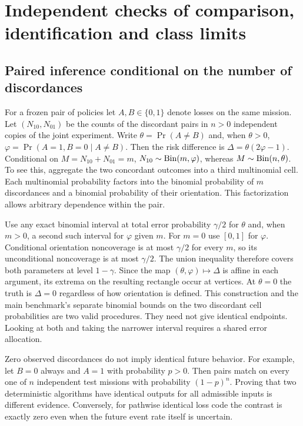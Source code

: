 \section{Independent checks of comparison, identification and class limits}
\subsection{Paired inference conditional on the number of discordances}
For a frozen pair of policies let $A,B\in\{0,1\}$ denote losses on the same mission. Let $(N_{10},N_{01})$ be the counts of the discordant pairs in $n>0$ independent copies of the joint experiment. Write $\theta=\Pr(A\ne B)$ and, when $\theta>0$, $\varphi=\Pr(A=1,B=0\mid A\ne B)$. Then the risk difference is $\Delta=\theta(2\varphi-1)$. Conditional on $M=N_{10}+N_{01}=m$, $N_{10}\sim{\rm Bin}(m,\varphi)$, whereas $M\sim{\rm Bin}(n,\theta)$. To see this, aggregate the two concordant outcomes into a third multinomial cell. Each multinomial probability factors into the binomial probability of $m$ discordances and a binomial probability of their orientation. This factorization allows arbitrary dependence within the pair.

Use any exact binomial interval at total error probability $\gamma/2$ for $\theta$ and, when $m>0$, a second such interval for $\varphi$ given $m$. For $m=0$ use $[0,1]$ for $\varphi$. Conditional orientation noncoverage is at most $\gamma/2$ for every $m$, so its unconditional noncoverage is at most $\gamma/2$. The union inequality therefore covers both parameters at level $1-\gamma$. Since the map $(\theta,\varphi)\mapsto\Delta$ is affine in each argument, its extrema on the resulting rectangle occur at vertices. At $\theta=0$ the truth is $\Delta=0$ regardless of how orientation is defined. This construction and the main benchmark's separate binomial bounds on the two discordant cell probabilities are two valid procedures. They need not give identical endpoints. Looking at both and taking the narrower interval requires a shared error allocation.

Zero observed discordances do not imply identical future behavior. For example, let $B=0$ always and $A=1$ with probability $p>0$. Then pairs match on every one of $n$ independent test missions with probability $(1-p)^n$. Proving that two deterministic algorithms have identical outputs for all admissible inputs is different evidence. Conversely, for pathwise identical loss code the contrast is exactly zero even when the future event rate itself is uncertain.

